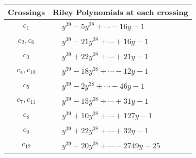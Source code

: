 \documentclass[1p]{elsarticle_modified}
\theoremstyle{definition}
\begin{document}
\begin{tabular}{m{50pt}|m{274pt}}
Crossings & \hspace{64pt}Riley Polynomials at each crossing \\
\hline $$\begin{aligned}c_{1}\end{aligned}$$&$\begin{aligned}
&y^{39}-5 y^{38}+\cdots-16 y-1
\end{aligned}$\\
\hline $$\begin{aligned}c_{2},c_{6}\end{aligned}$$&$\begin{aligned}
&y^{39}-21 y^{38}+\cdots+16 y-1
\end{aligned}$\\
\hline $$\begin{aligned}c_{3}\end{aligned}$$&$\begin{aligned}
&y^{39}+22 y^{38}+\cdots+21 y-1
\end{aligned}$\\
\hline $$\begin{aligned}c_{4},c_{10}\end{aligned}$$&$\begin{aligned}
&y^{39}-18 y^{38}+\cdots-12 y-1
\end{aligned}$\\
\hline $$\begin{aligned}c_{5}\end{aligned}$$&$\begin{aligned}
&y^{39}-2 y^{38}+\cdots-46 y-1
\end{aligned}$\\
\hline $$\begin{aligned}c_{7},c_{11}\end{aligned}$$&$\begin{aligned}
&y^{39}-15 y^{38}+\cdots+31 y-1
\end{aligned}$\\
\hline $$\begin{aligned}c_{8}\end{aligned}$$&$\begin{aligned}
&y^{39}+10 y^{38}+\cdots+127 y-1
\end{aligned}$\\
\hline $$\begin{aligned}c_{9}\end{aligned}$$&$\begin{aligned}
&y^{39}+22 y^{38}+\cdots+32 y-1
\end{aligned}$\\
\hline $$\begin{aligned}c_{12}\end{aligned}$$&$\begin{aligned}
&y^{39}-20 y^{38}+\cdots-2749 y-25
\end{aligned}$\\
\hline
\end{tabular}\\~\\
\end{document}
